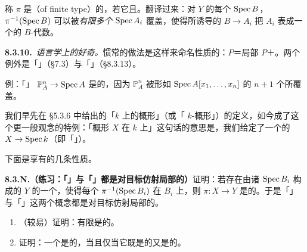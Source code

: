称\trMorphism{} $\pi$ 是\textbf{\trFiniteType}（of finite type）的，若它\trLocally\trFiniteType{}且\trQuasicompact。翻译过来：对 $Y$ 的每个\trAffine\trOpenSet{} $\operatorname{Spec} B$，$\pi^{-1}(\operatorname{Spec} B)$ 可以被\emph{有限多个}\trOpenSet{} $\operatorname{Spec} A_i$ 覆盖，使得所诱导的\trMorphism{} $B\to A_i$ 把 $A_i$ 表成一个\trFinitelyGenerated{}的 $B$-代数。

\textbf{8.3.10.}\ \emph{语言学上的好奇。}\quad 惯常的做法是这样来命名性质的：$P$＝局部 $P$＋\trQuasicompact。两个例外是「\trRingedSpace」（\S7.3）与「\trFinitelyPresented」（\S8.3.13）。

例：「\trStructureMorphism」 $\mathbb{P}^n_A\to\operatorname{Spec} A$ 是\trFiniteType{}的，因为 $\mathbb{P}^n_A$ 被形如 $\operatorname{Spec} A[x_1,\dots,x_n]$ 的 $n+1$ 个\trOpenSet{}所覆盖。

我们早先在 \S5.3.6 中给出的「$k$ 上\trFiniteType{}的概形」（或「\trFiniteType{} $k$-概形」）的定义，如今成了这个更一般观念的特例：「概形 $X$ 在 $k$ 上\trFiniteType」这句话的意思是，我们给定了一个\trFiniteType{}的\trMorphism{} $X\to\operatorname{Spec} k$（即「\trStructureMorphism」）。

下面是\trFiniteType{}\trMorphism{}享有的几条性质。

\textbf{8.3.N.（练习：「\trLocally\trFiniteType」与「\trFiniteType」都是对目标仿射局部的）}\quad 证明：若存在由诸\trAffine\trOpenSet{} $\operatorname{Spec} B_i$ 构成的 $Y$ 的一个\trCover{}，使得每个 $\pi^{-1}(\operatorname{Spec} B_i)$ 在 $B_i$ 上\trLocally\trFiniteType，则\trMorphism{} $\pi\colon X\to Y$ 是\trLocally\trFiniteType{}的。于是「\trLocally\trFiniteType」与「\trFiniteType」这两个概念都是对目标仿射局部的。

\begin{exercise}\label{ex:finite-integral-finite-type}
\begin{enumerate}[label=(\alph*)]
\item （较易）证明：有限\trMorphism{}是\trFiniteType{}的。
\item 证明：一个\trMorphism{}是\trFinite{}的，当且仅当它既是\trIntegral{}的又是\trFiniteType{}的。
\end{enumerate}
\end{exercise}

